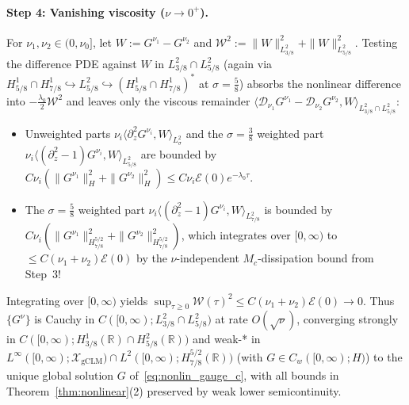 \documentclass[11pt,a4paper]{article}
\begin{document}
\paragraph{Step 4: Vanishing viscosity ($\nu \to 0^+$).}
For $\nu_1, \nu_2 \in (0, \nu_0]$, let $W := G^{\nu_1} - G^{\nu_2}$ and $\mathcal{W}^2 := \|W\|_{L^2_{3/8}}^2 + \|W\|_{L^2_{5/8}}^2$. Testing the difference PDE against $W$ in $L^2_{3/8} \cap L^2_{5/8}$ (again via $H^1_{5/8}\cap H^1_{7/8} \hookrightarrow L^2_{5/8} \hookrightarrow (H^1_{5/8}\cap H^1_{7/8})^*$ at $\sigma = \frac{5}{8}$) absorbs the nonlinear difference into $-\frac{\lambda_0}{2}\mathcal{W}^2$ and leaves only the viscous remainder $\langle \mathcal{D}_{\nu_1}G^{\nu_1} - \mathcal{D}_{\nu_2}G^{\nu_2}, W\rangle_{L^2_{3/8}\cap L^2_{5/8}}$:
\begin{itemize}
  \item Unweighted parts $\nu_i\langle \partial_z^2 G^{\nu_i}, W\rangle_{L^2_\sigma}$ and the $\sigma = \frac{3}{8}$ weighted part $\nu_i\langle (\partial_z^2 - 1)G^{\nu_i}, W\rangle_{L^2_{5/8}}$ are bounded by $C\nu_i(\|G^{\nu_1}\|_H^2 + \|G^{\nu_2}\|_H^2) \le C\nu_i\mathcal{E}(0)e^{-\lambda_0\tau}$.
  \item The $\sigma = \frac{5}{8}$ weighted part $\nu_i\langle (\partial_z^2 - 1)G^{\nu_i}, W\rangle_{L^2_{7/8}}$ is bounded by $C\nu_i(\|G^{\nu_1}\|_{H^{5/2}_{7/8}}^2 + \|G^{\nu_2}\|_{H^{5/2}_{7/8}}^2)$, which integrates over $[0,\infty)$ to $\le C(\nu_1 + \nu_2)\mathcal{E}(0)$ by the $\nu$-independent $M_c$-dissipation bound from Step~3!
\end{itemize}
Integrating over $[0,\infty)$ yields $\sup_{\tau \ge 0}\mathcal{W}(\tau)^2 \le C(\nu_1 + \nu_2)\mathcal{E}(0) \to 0$. Thus $\{G^\nu\}$ is Cauchy in $C([0,\infty); L^2_{3/8}\cap L^2_{5/8})$ at rate $O(\sqrt{\nu})$, converging strongly in $C([0,\infty); H^1_{3/8}(\mathbb{R})\cap H^2_{5/8}(\mathbb{R}))$ and weak-* in $L^\infty([0,\infty); \mathcal{X}_{\mathrm{gCLM}}) \cap L^2([0,\infty); H^{5/2}_{7/8}(\mathbb{R}))$ (with $G \in C_w([0,\infty); H)$) to the unique global solution $G$ of~\eqref{eq:nonlin_gauge_c}, with all bounds in Theorem~\ref{thm:nonlinear}(2) preserved by weak lower semicontinuity.
\end{document}
